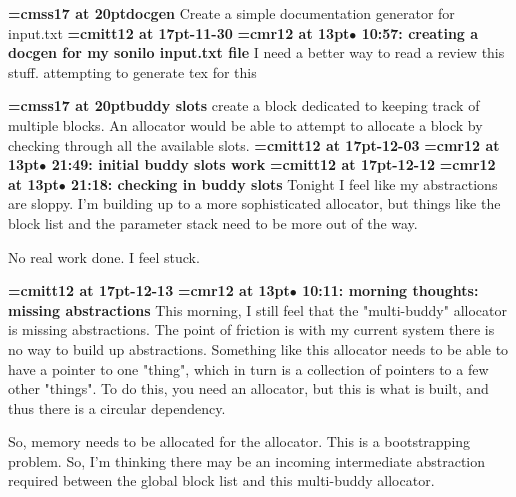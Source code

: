 {\medskip\noindent\bf\font\titlefont=cmss17 at 20pt\titlefont docgen}\medskip
Create a simple documentation generator for input.txt
{\medskip\noindent\bf\font\titlefont=cmitt12 at 17pt-11-30}\medskip
{\smallskip\noindent\bf\font\titlefont=cmr12 at 13pt\titlefont $\bullet$ 10:57: creating a docgen for my sonilo input.txt file}\smallskip
I need a better way to read a review this stuff. attempting to generate tex for this
\par

{\medskip\noindent\bf\font\titlefont=cmss17 at 20pt\titlefont buddy slots}\medskip
create a block dedicated to keeping track of multiple
blocks. An allocator would be able to attempt to allocate
a block by checking through all the available slots.
{\medskip\noindent\bf\font\titlefont=cmitt12 at 17pt-12-03}\medskip
{\smallskip\noindent\bf\font\titlefont=cmr12 at 13pt\titlefont $\bullet$ 21:49: initial buddy slots work}\smallskip
{\medskip\noindent\bf\font\titlefont=cmitt12 at 17pt-12-12}\medskip
{\smallskip\noindent\bf\font\titlefont=cmr12 at 13pt\titlefont $\bullet$ 21:18: checking in buddy slots}\smallskip
Tonight I feel like my abstractions are sloppy. I'm building up to a more sophisticated allocator, but things like the block list and the parameter stack need to be more out of the way.
\par

No real work done. I feel stuck.
\par

{\medskip\noindent\bf\font\titlefont=cmitt12 at 17pt-12-13}\medskip
{\smallskip\noindent\bf\font\titlefont=cmr12 at 13pt\titlefont $\bullet$ 10:11: morning thoughts: missing abstractions}\smallskip
This morning, I still feel that the "multi-buddy" allocator is missing abstractions. The point of friction is with my current system there is no way to build up abstractions. Something like this allocator needs to be able to have a pointer to one "thing", which in turn is a collection of pointers to a few other "things". To do this, you need an allocator, but this is what is built, and thus there is a circular dependency.
\par

So, memory needs to be allocated for the allocator. This is a bootstrapping problem. So, I'm thinking there may be an incoming intermediate abstraction required between the global block list and this multi-buddy allocator.
\par

